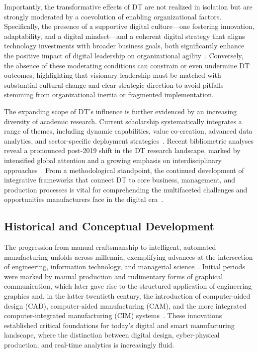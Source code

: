 \documentclass[sigconf]{acmart}
\begin{document}
Importantly, the transformative effects of DT are not realized in isolation but are strongly moderated by a coevolution of enabling organizational factors. Specifically, the presence of a supportive digital culture—one fostering innovation, adaptability, and a digital mindset—and a coherent digital strategy that aligns technology investments with broader business goals, both significantly enhance the positive impact of digital leadership on organizational agility~\cite{ref93}. Conversely, the absence of these moderating conditions can constrain or even undermine DT outcomes, highlighting that visionary leadership must be matched with substantial cultural change and clear strategic direction to avoid pitfalls stemming from organizational inertia or fragmented implementation.

The expanding scope of DT's influence is further evidenced by an increasing diversity of academic research. Current scholarship systematically integrates a range of themes, including dynamic capabilities, value co-creation, advanced data analytics, and sector-specific deployment strategies~\cite{ref91}. Recent bibliometric analyses reveal a pronounced post-2019 shift in the DT research landscape, marked by intensified global attention and a growing emphasis on interdisciplinary approaches~\cite{ref91}. From a methodological standpoint, the continued development of integrative frameworks that connect DT to core business, management, and production processes is vital for comprehending the multifaceted challenges and opportunities manufacturers face in the digital era~\cite{ref91,ref93}.

\subsection{Historical and Conceptual Development}

The progression from manual craftsmanship to intelligent, automated manufacturing unfolds across millennia, exemplifying advances at the intersection of engineering, information technology, and managerial science~\cite{ref50,ref54,ref62,ref63,ref67,ref86}. Initial periods were marked by manual production and rudimentary forms of graphical communication, which later gave rise to the structured application of engineering graphics and, in the latter twentieth century, the introduction of computer-aided design (CAD), computer-aided manufacturing (CAM), and the more integrated computer-integrated manufacturing (CIM) systems~\cite{ref50,ref54}. These innovations established critical foundations for today's digital and smart manufacturing landscape, where the distinction between digital design, cyber-physical production, and real-time analytics is increasingly fluid.
\end{document}
